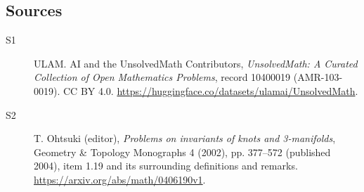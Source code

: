 \documentclass[11pt]{article}
\begin{document}
\subsection{Sources}
\begin{description}
\item[\hypertarget{source:10400019:1}{S1}] ULAM. AI and the UnsolvedMath Contributors, \emph{UnsolvedMath: A Curated Collection of Open Mathematics Problems}, record 10400019 (AMR-103-0019). CC BY 4.0. \url{https://huggingface.co/datasets/ulamai/UnsolvedMath}.
\item[\hypertarget{source:10400019:2}{S2}] T. Ohtsuki (editor), \emph{Problems on invariants of knots and 3-manifolds}, Geometry \& Topology Monographs 4 (2002), pp. 377--572 (published 2004), item 1.19 and its surrounding definitions and remarks. \url{https://arxiv.org/abs/math/0406190v1}.
\end{description}
\label{end:10400019}
\end{document}
